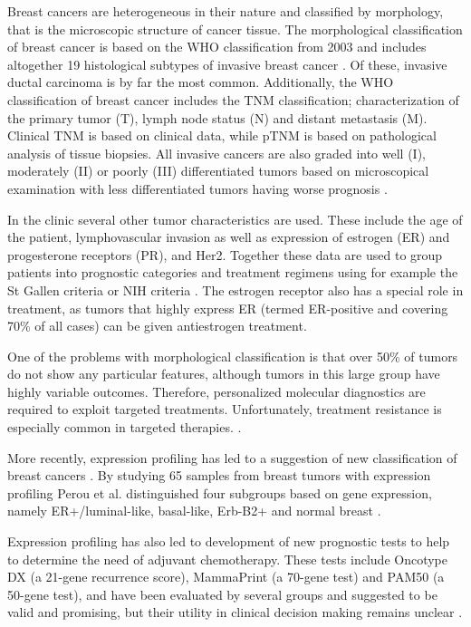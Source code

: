 Breast cancers are heterogeneous in their nature and classified by morphology,
that is the microscopic structure of cancer tissue.
The morphological classification of breast cancer is based on the WHO
classification from 2003 and includes altogether 19 histological subtypes of
invasive breast cancer \citep{Tavassoli2003,Weigelt2009}. Of these, invasive
ductal carcinoma is by far the most common. Additionally, the WHO
classification of breast cancer includes the TNM classification;
characterization of the primary tumor (T), lymph node status (N) and distant
metastasis (M). Clinical TNM is based on clinical data, while pTNM is based on
pathological analysis of tissue biopsies. All invasive cancers are also graded
into well (I), moderately (II) or poorly (III) differentiated tumors based on
microscopical examination
with less differentiated tumors having worse prognosis \citep{Tavassoli2003}.

In the clinic several other tumor characteristics are used. These include the
age of the patient, lymphovascular invasion as well as expression of estrogen
(ER) and progesterone receptors (PR), and Her2. Together these data are used
to group patients into prognostic categories and treatment regimens using for
example the St Gallen criteria \citep{Goldhirsch2007} or NIH criteria
\citep{Eifel2001}. The estrogen receptor also has a special role in treatment,
as tumors that highly express ER (termed ER-positive and covering 70\% of all
cases) can be given antiestrogen treatment.

One of the problems with morphological classification is that over 50\% of
tumors do not show any particular features, although tumors in this large
group have highly variable outcomes. Therefore, personalized molecular
diagnostics are required to exploit targeted treatments. Unfortunately,
treatment resistance is especially common in targeted therapies.
\citep{Oesterreich2013}.

More recently, expression profiling has led to a suggestion
of new classification of breast cancers \citep{Perou2000,Sorlie2001}. By studying 65
samples from breast tumors with expression profiling Perou et al.
distinguished four subgroups based on gene expression, namely
ER+/luminal-like, basal-like, Erb-B2+ and normal breast \citep{Perou2000}.

Expression profiling has also led to development of new prognostic tests to
help to determine the need of adjuvant chemotherapy. These tests include
Oncotype DX (a 21-gene recurrence score), MammaPrint (a 70-gene test) and PAM50
(a 50-gene test), and have been evaluated by several groups and suggested to be
valid and promising, but their utility in clinical decision making remains
unclear \citep{Azim2013}.




